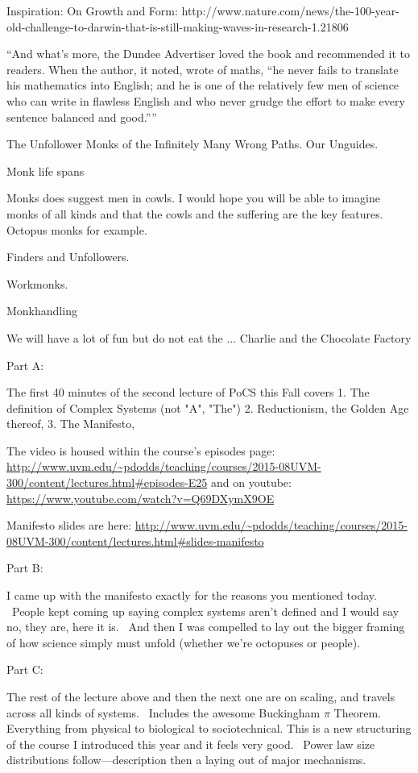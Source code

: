 Inspiration:
On Growth and Form:
http://www.nature.com/news/the-100-year-old-challenge-to-darwin-that-is-still-making-waves-in-research-1.21806


``And what’s more, the Dundee Advertiser loved the book and recommended it to readers. When the author, it noted, wrote of maths, “he never fails to translate his mathematics into English; and he is one of the relatively few men of science who can write in flawless English and who never grudge the effort to make every sentence balanced and good.”''


The Unfollower Monks of the Infinitely Many Wrong Paths.
Our Unguides.

Monk life spans

Monks does suggest men in cowls.
I would hope you will be able to imagine monks of all kinds
and that the cowls and the suffering are the key features.
Octopus monks for example.

Finders and Unfollowers.

Workmonks.

Monkhandling

We will have a lot of fun but do not eat the ... Charlie and the Chocolate Factory




Part A:

The first 40 minutes of the second lecture of PoCS this Fall covers
1. The definition of Complex Systems (not "A", "The")
2. Reductionism, the Golden Age thereof,
3. The Manifesto,

The video is housed within the course's episodes page:
\url{http://www.uvm.edu/~pdodds/teaching/courses/2015-08UVM-300/content/lectures.html\#episodes-E25}
and on youtube:
\url{https://www.youtube.com/watch?v=Q69DXymX9OE}

Manifesto slides are here:
\url{http://www.uvm.edu/~pdodds/teaching/courses/2015-08UVM-300/content/lectures.html\#slides-manifesto}

Part B:

I came up with the manifesto exactly for the reasons you mentioned today.  People kept coming up saying complex systems
aren't defined and I would say no, they are, here it is.  And then I was compelled to lay out the bigger framing of how
science simply must unfold (whether we're octopuses or people).

Part C:

The rest of the lecture above and then the next one are on scaling,
and travels across all kinds of systems.  Includes the awesome Buckingham $\pi$ Theorem.
Everything from physical to biological to sociotechnical.
This is a new structuring of the course I introduced this year
and it feels very good.  Power law size distributions follow---description
then a laying out of major mechanisms.



